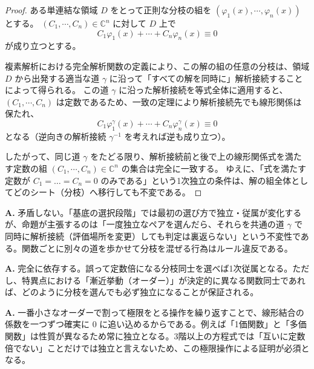 \begin{proof}
    ある単連結な領域 $D$ をとって正則な分枝の組を $(\varphi_{1}(x),\cdots,\varphi_{n}(x))$ とする。
    $(C_{1},\cdots,C_{n})\in\mathbb{C}^{n}$ に対して $D$ 上で
    \[
    C_{1}\varphi_{1}(x)+\cdots+C_{n}\varphi_{n}(x) \equiv 0
    \]
    が成り立つとする。
    
    複素解析における完全解析関数の定義により、この解の組の任意の分枝は、領域 $D$ から出発する適当な道 $\gamma$ に沿って「すべての解を同時に」解析接続することによって得られる。
    この道 $\gamma$ に沿った解析接続を等式全体に適用すると、$(C_{1},\cdots,C_{n})$ は定数であるため、一致の定理により解析接続先でも線形関係は保たれ、
    \[
    C_{1}\varphi_{1}^{\gamma}(x)+\cdots+C_{n}\varphi_{n}^{\gamma}(x) \equiv 0
    \]
    となる（逆向きの解析接続 $\gamma^{-1}$ を考えれば逆も成り立つ）。
    
    したがって、同じ道 $\gamma$ をたどる限り、解析接続前と後で上の線形関係式を満たす定数の組 $(C_{1},\cdots,C_{n})\in\mathbb{C}^{n}$ の集合は完全に一致する。
    ゆえに、「式を満たす定数が $C_1=\dots=C_n=0$ のみである」という1次独立の条件は、解の組全体としてどのシート（分枝）へ移行しても不変である。
\end{proof}

\begin{Q}
\textbf{A.} 矛盾しない。「基底の選択段階」では最初の選び方で独立・従属が変化するが、命題が主張するのは「一度独立なペアを選んだら、それらを共通の道 $\gamma$ で同時に解析接続（評価場所を変更）しても判定は裏返らない」という不変性である。関数ごとに別々の道を歩かせて分枝を混ぜる行為はルール違反である。
\end{Q}

\begin{Q}
\textbf{A.} 完全に依存する。誤って定数倍になる分枝同士を選べば1次従属となる。ただし、特異点における「漸近挙動（オーダー）」が決定的に異なる関数同士であれば、どのように分枝を選んでも必ず独立になることが保証される。
\end{Q}

\begin{Q}
\textbf{A.} 一番小さなオーダーで割って極限をとる操作を繰り返すことで、線形結合の係数を一つずつ確実に $0$ に追い込めるからである。例えば「1価関数」と「多価関数」は性質が異なるため常に独立となる。3階以上の方程式では「互いに定数倍でない」ことだけでは独立と言えないため、この極限操作による証明が必須となる。
\end{Q}


